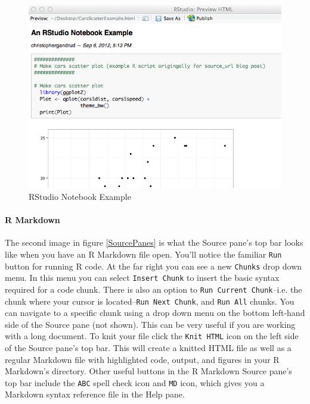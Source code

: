 \documentclass[krantz1]{krantz}
\begin{document}
\begin{figure}
    \caption{RStudio Notebook Example}
    \label{NotebookExample}
    \begin{center}
    
\includegraphics[scale=0.4]{Children/Chapter3/images3/NotebookExample.png}
    \end{center}
\end{figure}

\paragraph{R Markdown} The second image in figure \ref{SourcePanes} is what the Source pane's top bar looks like when you have an R Markdown file open. You'll notice the familiar \texttt{Run} button for running R code. At the far right you can see a new \texttt{Chunks} drop down menu. In this menu you can select \texttt{Insert Chunk} to insert the basic syntax required for a code chunk. There is also an option to \texttt{Run Current Chunk}--i.e. the chunk where your cursor is located--\texttt{Run Next Chunk}, and \texttt{Run All} chunks. You can navigate to a specific chunk using a drop down menu on the bottom left-hand side of the Source pane (not shown). This can be very useful if you are working with a long document. To knit your file click the \texttt{Knit HTML} icon on the left side of the Source pane's top bar. This will create a knitted HTML file as well as a regular Markdown file with highlighted code, output, and figures in your R Markdown's directory. Other useful buttons in the R Markdown Source pane's top bar include the \texttt{ABC} spell check icon and \texttt{MD} icon, which gives you a Markdown syntax reference file in the Help pane.
\end{document}
